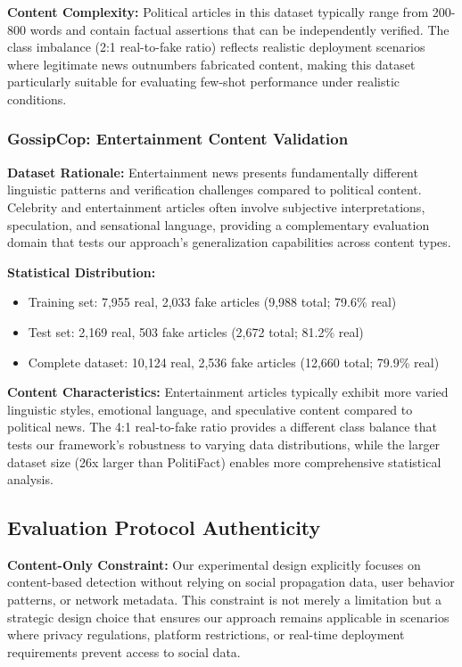 \textbf{Content Complexity:} Political articles in this dataset typically range from 200-800 words and contain factual assertions that can be independently verified. The class imbalance (2:1 real-to-fake ratio) reflects realistic deployment scenarios where legitimate news outnumbers fabricated content, making this dataset particularly suitable for evaluating few-shot performance under realistic conditions.

\subsubsection{GossipCop: Entertainment Content Validation}

\textbf{Dataset Rationale:} Entertainment news presents fundamentally different linguistic patterns and verification challenges compared to political content. Celebrity and entertainment articles often involve subjective interpretations, speculation, and sensational language, providing a complementary evaluation domain that tests our approach's generalization capabilities across content types.

\textbf{Statistical Distribution:}
\begin{itemize}
\item Training set: 7,955 real, 2,033 fake articles (9,988 total; 79.6\% real)  
\item Test set: 2,169 real, 503 fake articles (2,672 total; 81.2\% real)
\item Complete dataset: 10,124 real, 2,536 fake articles (12,660 total; 79.9\% real)
\end{itemize}

\textbf{Content Characteristics:} Entertainment articles typically exhibit more varied linguistic styles, emotional language, and speculative content compared to political news. The 4:1 real-to-fake ratio provides a different class balance that tests our framework's robustness to varying data distributions, while the larger dataset size (26x larger than PolitiFact) enables more comprehensive statistical analysis.

\subsection{Evaluation Protocol Authenticity}

\textbf{Content-Only Constraint:} Our experimental design explicitly focuses on content-based detection without relying on social propagation data, user behavior patterns, or network metadata. This constraint is not merely a limitation but a strategic design choice that ensures our approach remains applicable in scenarios where privacy regulations, platform restrictions, or real-time deployment requirements prevent access to social data.

